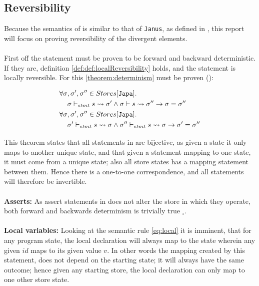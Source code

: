 \subsection{Reversibility} \label{subsec:reversibility}
Because the semantics of \lan is similar to that of \texttt{Janus}, as defined in \cite{janus},
this report will focus on proving reversibility of the divergent elements.
\\
\\
First off the statement must be proven to be forward and backward deterministic. If they are,
definition \autoref{def:def:localReversibility} holds, and the statement is locally reversible.
For this \autoref{theorem:determinism} must be proven (\cite{janus}):
\begin{theorem} \label{theorem:determinism}
    \begin{align*}
        \forall \sigma&, \sigma', \sigma''\in Stores[\texttt{Japa}]. \\
        &\sigma \vdash_{stmt} s \leadsto \sigma' \land \sigma \vdash s \leadsto \sigma''
            \rightarrow \sigma = \sigma'' \\
        \forall \sigma&, \sigma', \sigma''\in Stores[\texttt{Japa}]. \\
        &\sigma' \vdash_{stmt} s \leadsto \sigma \land \sigma'' \vdash_{stmt} s \leadsto \sigma
            \rightarrow \sigma' = \sigma''
    \end{align*}
\end{theorem}
\noindent
This theorem states that all statements in \lan are bijective, as given a state it only maps to
another unique state, and that given a statement mapping to one state, it must come from a
unique state; also all store states has a mapping statement between them.
Hence there is a one-to-one correspondence, and all statements will therefore be
invertible.
\\
\\
\textbf{Asserts:}
As assert statements in \lan does not alter the store in which they operate, both
forward and backwards determinism is trivially true $_\square$.
\\
\\
\textbf{Local variables:}
Looking at the semantic rule \eqref{eq:local} it is imminent, that for any program state,
the local declaration will always map to the state wherein any given $id$ maps to its given value
$v$. In other words the mapping created by this statement, does not depend on the starting state;
it will always have the same outcome; hence given any starting store, the local declaration can
only map to one other store state.

